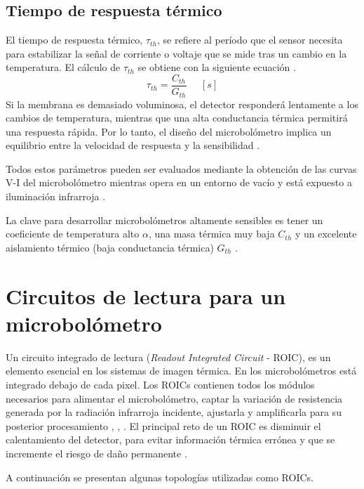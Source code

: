         \subsection{Tiempo de respuesta térmico}
         El tiempo de respuesta térmico, $\tau_{th}$, se refiere al período que el sensor necesita para estabilizar la señal de corriente o voltaje que se mide tras un cambio en la temperatura. El cálculo de $\tau_{th}$ se obtiene con la siguiente ecuación \cite{Jimenez}.
        \begin{equation}
        \tau_{th} =\frac{C_{th}}{G_{th}}\phantom{abc} [s]
        \label{eq:Tth}
        \end{equation}          
Si la membrana es demasiado voluminosa, el detector responderá lentamente a los cambios de temperatura, mientras que una alta conductancia térmica permitirá una respuesta rápida. Por lo tanto, el diseño del microbolómetro implica un equilibrio entre la velocidad de respuesta y la sensibilidad \cite{Jimenez}.        
        

Todos estos parámetros pueden ser evaluados mediante la obtención de las curvas V-I del microbolómetro mientras opera en un entorno de vacío y está expuesto a iluminación infrarroja \cite{Hernandez2021}.

        
La clave para desarrollar microbolómetros altamente sensibles es tener un coeficiente de temperatura alto $\alpha$, una masa térmica muy baja $C_{th}$ y un excelente aislamiento térmico (baja conductancia térmica) $G_{th}$ \cite{Rogalski}.

\section{Circuitos de lectura para un microbolómetro}

Un circuito integrado de lectura (\textit{Readout Integrated Circuit} - ROIC), es un elemento esencial en los sistemas de imagen térmica. En los microbolómetros está integrado debajo de cada pixel. Los ROICs contienen todos los módulos necesarios para alimentar el microbolómetro, captar la variación de resistencia generada por la radiación infrarroja incidente, ajustarla y amplificarla para su posterior procesamiento \cite{BlancoMDA}, \cite{Budzier}, \cite{Fusetto2023}. El principal reto de un ROIC es disminuir el calentamiento del detector, para evitar información térmica errónea y que se incremente el riesgo de daño permanente \cite{Moreno2022}.


A continuación se presentan algunas topologías utilizadas como ROICs.

